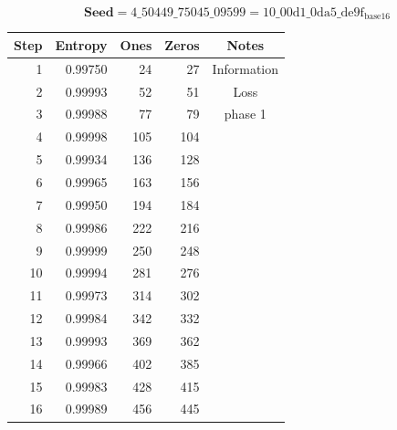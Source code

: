 \documentclass[preprint]{sigplanconf}
\begin{document}
\begin{table} [ht]
    \begin{center}
        $$\textbf{Seed} = 4\_50449\_75045\_09599 = 10\_00\text{d}1\_0\text{da}5\_\text{de}9\text{f}_{\text{base} 16}$$
        \begin{tabular}{|r|r|r|r|c|}
            \hline
            \textbf{Step} & \textbf{Entropy} & \textbf{Ones} & \textbf{Zeros} & \textbf{Notes} \\
            \hline
            1             & 0.99750          & 24            & 27             & Information    \\
            2             & 0.99993          & 52            & 51             & Loss           \\
            3             & 0.99988          & 77            & 79             & phase 1        \\
            4             & 0.99998          & 105           & 104            &                \\
            5             & 0.99934          & 136           & 128            &                \\
            6             & 0.99965          & 163           & 156            &                \\
            7             & 0.99950          & 194           & 184            &                \\
            8             & 0.99986          & 222           & 216            &                \\
            9             & 0.99999          & 250           & 248            &                \\
            10            & 0.99994          & 281           & 276            &                \\
            11            & 0.99973          & 314           & 302            &                \\
            12            & 0.99984          & 342           & 332            &                \\
            13            & 0.99993          & 369           & 362            &                \\
            14            & 0.99966          & 402           & 385            &                \\
            15            & 0.99983          & 428           & 415            &                \\
            16            & 0.99989          & 456           & 445            &                \\

\end{tabular}
\end{center}
\end{table}
\end{document}
